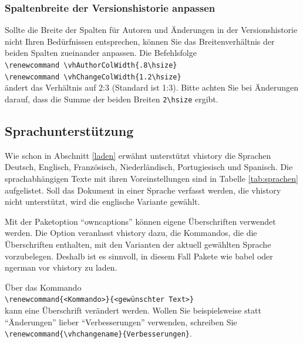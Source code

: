 \subsubsection{Spaltenbreite der Versionshistorie anpassen}
Sollte die Breite der Spalten für Autoren und Änderungen in der Versionshistorie nicht Ihren Bedürfnissen entsprechen, können Sie das Breitenverhältnis der beiden Spalten zueinander anpassen. Die Befehlsfolge\\
\mbox{}\hspace{2em}\verb|\renewcommand \vhAuthorColWidth{.8\hsize}|\\
\mbox{}\hspace{2em}\verb|\renewcommand \vhChangeColWidth{1.2\hsize}|\\
ändert das Verhältnis auf 2:3 (Standard ist 1:3). Bitte achten Sie bei Änderungen darauf, dass die Summe der beiden Breiten \verb|2\hsize| ergibt.

\subsection{Sprachunterstützung}\label{sprachen}
Wie schon in Abschnitt \ref{laden} erwähnt unterstützt vhistory die Sprachen Deutsch, Englisch, Französisch, Niederländisch, Portugiesisch und Spanisch. Die sprachabhängigen Texte mit ihren Voreinstellungen sind in Tabelle \ref{tab:sprachen} aufgelistet. Soll das Dokument in einer Sprache verfasst werden, die vhistory nicht unterstützt, wird die englische Variante gewählt.

Mit der Paketoption "`owncaptions"' können eigene Überschriften verwendet werden. Die Option veranlasst vhistory dazu, die Kommandos, die die Überschriften enthalten, mit den Varianten der aktuell gewählten Sprache vorzubelegen. Deshalb ist es sinnvoll, in diesem Fall Pakete wie babel oder ngerman vor vhistory zu laden.

Über das Kommando\\
\mbox{}\hspace{2em}\verb|\renewcommand{<Kommando>}{<gewünschter Text>}|\\
kann eine Überschrift verändert werden. Wollen Sie beispielsweise statt "`Änderungen"' lieber "`Verbesserungen"' verwenden, schreiben Sie\\
\mbox{}\hspace{2em}\verb|\renewcommand{\vhchangename}{Verbesserungen}|.

